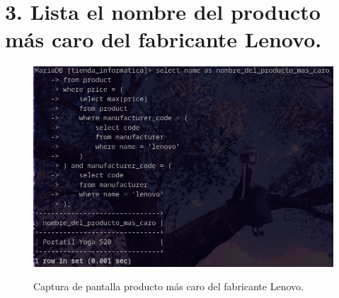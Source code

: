 \documentclass{article}
\begin{document}
\section*{3. Lista el nombre del producto más caro del fabricante Lenovo.}

\begin{figure}[ht]
    \centering
    {
        \includegraphics[width=\linewidth]{07screenshot.png} %
    }
    \caption{Captura de pantalla producto más caro del fabricante Lenovo.}
\end{figure}
\end{document}
